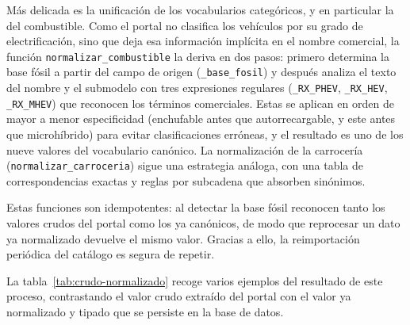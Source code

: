 Más delicada es la unificación de los vocabularios categóricos, y en particular la
del combustible. Como el portal no clasifica los vehículos por su grado de
electrificación, sino que deja esa información implícita en el nombre comercial,
la función \texttt{normalizar\_combustible} la deriva en dos pasos: primero
determina la base fósil a partir del campo de origen (\texttt{\_base\_fosil}) y
después analiza el texto del nombre y el submodelo con tres expresiones regulares
(\texttt{\_RX\_PHEV}, \texttt{\_RX\_HEV}, \texttt{\_RX\_MHEV}) que reconocen los
términos comerciales. Estas se aplican en orden de mayor a menor especificidad
(enchufable antes que autorrecargable, y este antes que microhíbrido) para evitar
clasificaciones erróneas, y el resultado es uno de los nueve valores del
vocabulario canónico. La normalización de la carrocería
(\texttt{normalizar\_carroceria}) sigue una estrategia análoga, con una tabla de
correspondencias exactas y reglas por subcadena que absorben sinónimos.

Estas funciones son idempotentes: al detectar la base fósil reconocen tanto los
valores crudos del portal como los ya canónicos, de modo que reprocesar un dato ya
normalizado devuelve el mismo valor. Gracias a ello, la reimportación periódica
del catálogo es segura de repetir.

La tabla~\ref{tab:crudo-normalizado} recoge varios ejemplos del resultado de
este proceso, contrastando el valor crudo extraído del portal con el valor ya
normalizado y tipado que se persiste en la base de datos.

